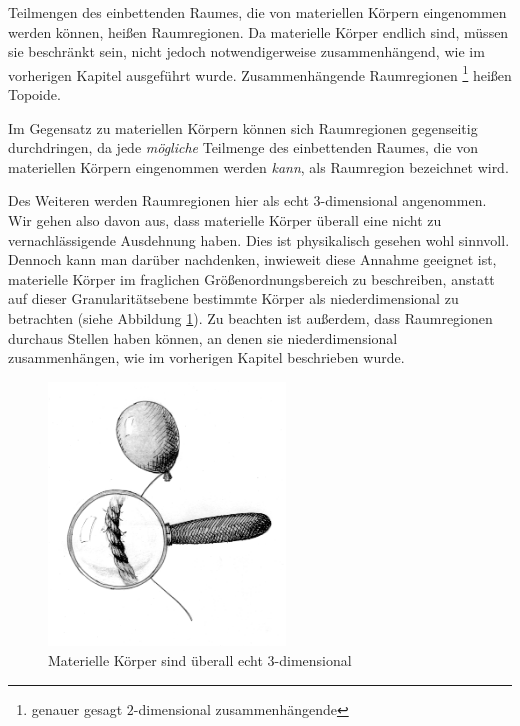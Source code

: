         Teilmengen des einbettenden Raumes, die von materiellen Körpern eingenommen werden können, heißen Raumregionen.
        Da materielle Körper endlich sind, müssen sie beschränkt sein, nicht jedoch notwendigerweise zusammenhängend, wie im vorherigen Kapitel ausgeführt wurde. 
        Zusammenhängende Raumregionen%
        \footnote{
            genauer gesagt $2$-dimensional zusammenhängende
        }
        heißen Topoide.
	
        Im Gegensatz zu materiellen Körpern können sich Raumregionen gegenseitig durchdringen,
        da jede \textit{mögliche} Teilmenge des einbettenden Raumes, die von materiellen Körpern eingenommen werden \textit{kann}, als Raumregion bezeichnet wird.
        
        Des Weiteren werden Raumregionen hier als echt $3$-dimensional angenommen. 
        Wir gehen also davon aus, dass materielle Körper überall eine nicht zu vernachlässigende Ausdehnung haben.
        Dies ist physikalisch gesehen wohl sinnvoll. 
        Dennoch kann man darüber nachdenken, inwieweit diese Annahme geeignet ist, materielle Körper im fraglichen Größenordnungsbereich zu beschreiben, anstatt auf dieser Granularitätsebene bestimmte Körper als niederdimensional zu betrachten (siehe Abbildung \ref{fig:echt-3-dim}).
        Zu beachten ist außerdem, dass Raumregionen durchaus Stellen haben können, an denen sie niederdimensional zusammenhängen, wie im vorherigen Kapitel beschrieben wurde.
	
        \begin{figure}[ht]
            \centering
            \includegraphics[height=7cm]{abb/echt-3-dim.png}
            \caption{Materielle Körper sind überall echt $3$-dimensional}
            \label{fig:echt-3-dim}
        \end{figure}

